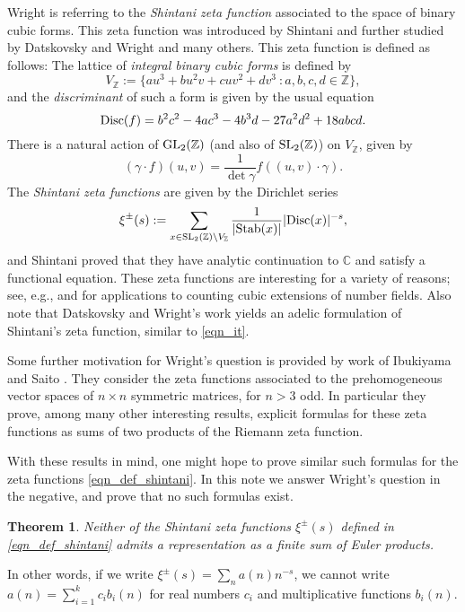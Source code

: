 \documentclass[12pt]{amsart}
\newtheorem{theorem}{Theorem}
\theoremstyle{remark}
\numberwithin{theorem}{section} \numberwithin{equation}{section}
\newcommand{\C}{\mathbb{C}}
\newcommand{\Z}{\mathbb{Z}}
\newcommand{\SL}{{\text {\rm SL}}}
\newcommand{\GL}{{\text {\rm GL}}}
\newcommand{\Disc}{\textnormal{Disc}}
\newcommand{\Stab}{\textnormal{Stab}}
\begin{document}
Wright is referring to the {\itshape Shintani zeta function} associated to the space of binary cubic forms.
This zeta function was introduced by Shintani \cite{S} and further studied by Datskovsky and Wright \cite{DW1, DW2, DW3} and 
many others. This zeta function is defined as follows:
The lattice of {\itshape integral binary cubic forms} is defined by
\begin{equation}\label{def_vz}
V_{\Z} := \{ a u^3 + b u^2 v + c u v^2 + d v^3 \ : a, b, c, d \in \Z \},
\end{equation}
and the {\itshape discriminant} of such a form is given by the usual equation
\begin{equation}\label{eqn_disc_formula}
\Disc(f) = b^2 c^2 - 4 a c^3 - 4 b^3 d - 27 a^2 d^2 + 18 abcd.
\end{equation}
There is a natural action of $\GL_2(\Z)$ (and also of $\SL_2(\Z)$) on $V_{\Z}$, given by
\begin{equation}
(\gamma \cdot f)(u, v) = \frac{1}{\det \gamma} f((u, v) \cdot \gamma).
\end{equation}
The {\itshape Shintani zeta functions} are given by the Dirichlet series
\begin{equation}\label{eqn_def_shintani}
\xi^{\pm}(s) := \sum_{x \in \SL_2(\Z) \backslash V_{\Z}} \frac{1}{|\Stab(x)|} |\Disc(x)|^{-s},
\end{equation}
and Shintani proved that they have analytic continuation to $\C$ and satisfy a functional equation.
These zeta functions are interesting for a variety of reasons; see, e.g., \cite{TT} and \cite{DW3} for
applications to counting cubic extensions of number fields. Also note that Datskovsky and Wright's
work yields an adelic formulation of Shintani's zeta function, similar to \eqref{eqn_it}.

Some further motivation for Wright's question is provided by work of Ibukiyama and Saito \cite{IS}.
They consider the zeta functions associated to the prehomogeneous vector spaces of $n \times n$
symmetric matrices, for $n > 3$ odd. In particular they prove, among many other interesting results, 
explicit formulas for these zeta functions as sums of two products of the Riemann zeta function. 

With these results in mind, one might hope to prove similar such formulas 
for the zeta functions \eqref{eqn_def_shintani}. In this note we answer Wright's
question in the negative, and prove that no such formulas exist.
\begin{theorem}\label{thm_main}
Neither of the Shintani zeta functions $\xi^{\pm}(s)$ defined in \eqref{eqn_def_shintani} admits a
representation as a finite sum of Euler products.
\end{theorem}
In other words, if we write $\xi^{\pm}(s) = \sum_n a(n) n^{-s}$, we cannot write $a(n) = \sum_{i = 1}^k c_i b_i(n)$
for real numbers $c_i$ and multiplicative functions $b_i(n)$.
\end{document}
